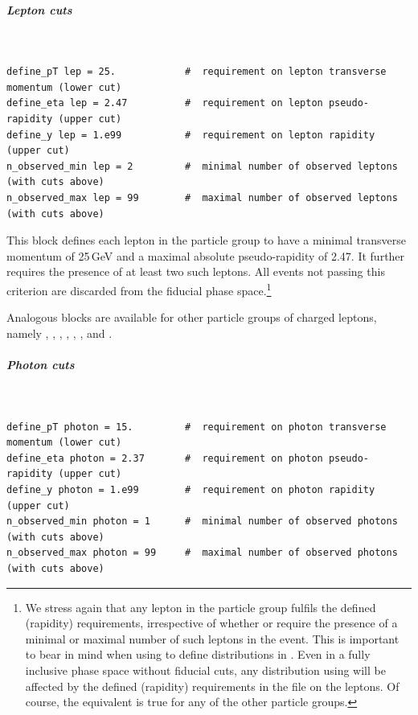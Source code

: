 \documentclass[english,11pt]{article}
\newenvironment{absolutelynopagebreak}
  {\par\nobreak\vfil\penalty0\vfilneg
   \vtop\bgroup}
  {\par\xdef\tpd{\the\prevdepth}\egroup
   \prevdepth=\tpd}
\begin{document}
\subparagraph{Lepton cuts}\quad
{\tt
\begin{lstlisting}
define_pT lep = 25.            #  requirement on lepton transverse momentum (lower cut)
define_eta lep = 2.47          #  requirement on lepton pseudo-rapidity (upper cut)
define_y lep = 1.e99           #  requirement on lepton rapidity (upper cut)
n_observed_min lep = 2         #  minimal number of observed leptons (with cuts above)
n_observed_max lep = 99        #  maximal number of observed leptons (with cuts above)
\end{lstlisting}
}
This block defines each lepton in the particle group  to 
have a minimal transverse momentum of 25\,GeV and a maximal absolute pseudo-rapidity 
of 2.47. It further requires the presence of at least two such leptons. All 
events not passing this criterion are discarded from the fiducial 
phase space.\footnote{We stress again that any lepton in the 
particle group  fulfils the defined (rapidity) requirements, irrespective 
of whether  or  
require the presence of a minimal or maximal number of such leptons in the event. 
This is important to 
bear in mind when using  to define distributions 
in . Even in a fully inclusive phase space without 
fiducial cuts, any distribution using  will be affected 
by the defined (rapidity) requirements in the file  on the leptons.
Of course, the equivalent is true for any of the other particle groups.}

Analogous blocks are available for other particle groups of charged leptons,
namely , , , , , ,  and .


\subparagraph{Photon cuts}\quad
{\tt
\begin{lstlisting}
define_pT photon = 15.         #  requirement on photon transverse momentum (lower cut)
define_eta photon = 2.37       #  requirement on photon pseudo-rapidity (upper cut)
define_y photon = 1.e99        #  requirement on photon rapidity (upper cut)
n_observed_min photon = 1      #  minimal number of observed photons (with cuts above)
n_observed_max photon = 99     #  maximal number of observed photons (with cuts above)
\end{lstlisting}
}
\end{document}
